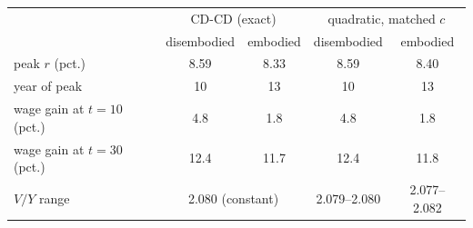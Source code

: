\begin{tabular}{lcccc}\toprule
 & \multicolumn{2}{c}{CD-CD (exact)} & \multicolumn{2}{c}{quadratic, matched $c$}\\
 & disembodied & embodied & disembodied & embodied\\\midrule
peak $r$ (pct.) & 8.59 & 8.33 & 8.59 & 8.40\\
year of peak & 10 & 13 & 10 & 13\\
wage gain at $t=10$ (pct.) & 4.8 & 1.8 & 4.8 & 1.8\\
wage gain at $t=30$ (pct.) & 12.4 & 11.7 & 12.4 & 11.8\\
$V/Y$ range & \multicolumn{2}{c}{2.080 (constant)} & 2.079--2.080 & 2.077--2.082\\
\bottomrule\end{tabular}
